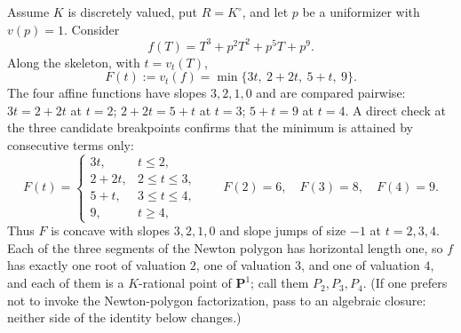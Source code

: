 \begin{example}
\label{ex:ch08-newton-cubic}
Assume $K$ is discretely valued, put $R=K^\circ$, and let $p$ be a
uniformizer with $v(p)=1$.  Consider
\[
                 f(T)=T^3+p^2T^2+p^5T+p^9 .
\]
Along the skeleton, with $t=v_t(T)$,
\[
 F(t):=v_t(f)=\min\{3t,\ 2+2t,\ 5+t,\ 9\} .
\]
The four affine functions have slopes $3,2,1,0$ and are compared pairwise:
$3t=2+2t$ at $t=2$; $2+2t=5+t$ at $t=3$; $5+t=9$ at $t=4$.  A direct check
at the three candidate breakpoints confirms that the minimum is attained by
consecutive terms only:
\[
 F(t)=
 \begin{cases}
  3t, & t\leq2,\\
  2+2t, & 2\leq t\leq3,\\
  5+t, & 3\leq t\leq4,\\
  9, & t\geq4,
 \end{cases}
 \qquad
 F(2)=6,\quad F(3)=8,\quad F(4)=9 .
\]
Thus $F$ is concave with slopes $3,2,1,0$ and slope jumps of size $-1$ at
$t=2,3,4$.  Each of the three segments of the Newton polygon has horizontal
length one, so $f$ has exactly one root of valuation $2$, one of valuation
$3$, and one of valuation $4$, and each of them is a $K$-rational point of
$\mathbf P^1$; call them $P_2,P_3,P_4$.  (If one prefers not to invoke the
Newton-polygon factorization, pass to an algebraic closure: neither side of
the identity below changes.)


\end{example}
